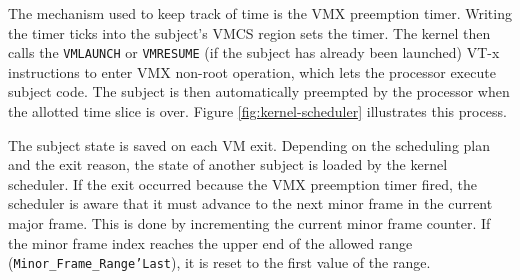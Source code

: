The mechanism used to keep track of time is the VMX preemption timer. Writing
the timer ticks into the subject's VMCS region sets the timer. The kernel then
calls the \texttt{VMLAUNCH} or \texttt{VMRESUME} (if the subject has already
been launched) VT-x instructions to enter VMX non-root operation, which lets the
processor execute subject code.  The subject is then automatically preempted by
the processor when the allotted time slice is over. Figure
\ref{fig:kernel-scheduler} illustrates this process.

The subject state is saved on each VM exit. Depending on the scheduling plan and
the exit reason, the state of another subject is loaded by the kernel scheduler.
If the exit occurred because the VMX preemption timer fired, the scheduler is
aware that it must advance to the next minor frame in the current major frame.
This is done by incrementing the current minor frame counter. If the minor frame
index reaches the upper end of the allowed range
(\texttt{Minor\_Frame\_Range'Last}), it is reset to the first value of the
range.
